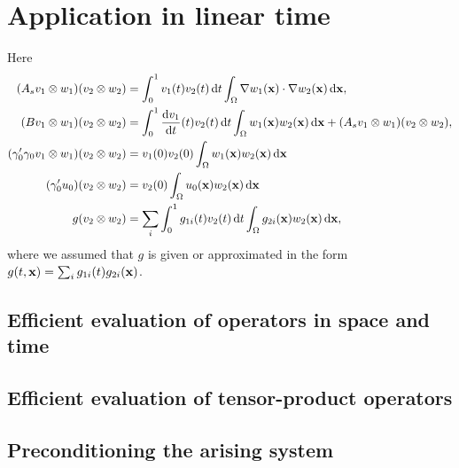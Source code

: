 \documentclass[11pt,a4paper,oneside,english]{amsart}
\numberwithin{equation}{section}
\numberwithin{theorem}{section}
\theoremstyle{definition}
\newcommand{\jw}[1]{{\color{red}{JW: #1}}}
\begin{document}
\section{Application in linear time}
\jw{XYZ inleiding.}

Here
\begin{align*}
(A_s v_1 \otimes w_1)(v_2 \otimes w_2)&=\int_0^1 v_1(t) v_2(t)\dif t \int_\Omega \nabla w_1({\bf x})\cdot  \nabla w_2({\bf x}) \dif{\bf x},\\
(B v_1 \otimes w_1)(v_2 \otimes w_2)&=\int_0^1 \frac{\dif v_1}{\dif t}(t) v_2(t)\dif t \int_\Omega w_1({\bf x}) w_2({\bf x}) \dif {\bf x}+(A_s v_1 \otimes w_1)(v_2 \otimes w_2),\\
(\gamma_0' \gamma_0 v_1 \otimes w_1)(v_2 \otimes w_2)&=
v_1(0) v_2(0)\int_\Omega w_1({\bf x}) w_2({\bf x}) \dif {\bf x}\\
(\gamma_0' u_0)(v_2 \otimes w_2)&=v_2(0) \int_\Omega u_0({\bf x}) w_2({\bf x}) \dif {\bf x}\\
g(v_2 \otimes w_2)&=\sum_i \int_0^1g_{1i}(t) v_2(t)\dif t \int_\Omega g_{2i}({\bf x}) w_2({\bf x}) \dif  {\bf x},
\end{align*}
where we assumed that $g$ is given or approximated in the form $g(t,{\bf x})=\sum_i g_{1i}(t) g_{2i}({\bf x})$.


\subsection{Efficient evaluation of operators in space and time}
\jw{willen we hier de sectie uit followup copy-pasten of is een referentie naar nicos' phd of dat paper met kestler voldoende?}
\subsection{Efficient evaluation of tensor-product operators}
\jw{willen we hier de sectie uit followup copy-pasten of is een referentie naar nicos' phd of dat paper met kestler voldoende?}

\subsection{Preconditioning the arising system}
\jw{introduce operator preconditioning}
\end{document}

